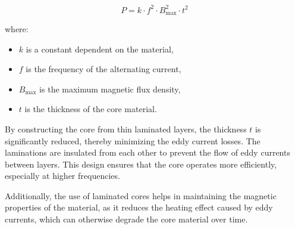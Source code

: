 \[
P = k \cdot f^2 \cdot B_{\text{max}}^2 \cdot t^2
\]

where:
\begin{itemize}
    \item \( k \) is a constant dependent on the material,
    \item \( f \) is the frequency of the alternating current,
    \item \( B_{\text{max}} \) is the maximum magnetic flux density,
    \item \( t \) is the thickness of the core material.
\end{itemize}

By constructing the core from thin laminated layers, the thickness \( t \) is significantly reduced, thereby minimizing the eddy current losses. The laminations are insulated from each other to prevent the flow of eddy currents between layers. This design ensures that the core operates more efficiently, especially at higher frequencies.

Additionally, the use of laminated cores helps in maintaining the magnetic properties of the material, as it reduces the heating effect caused by eddy currents, which can otherwise degrade the core material over time.

